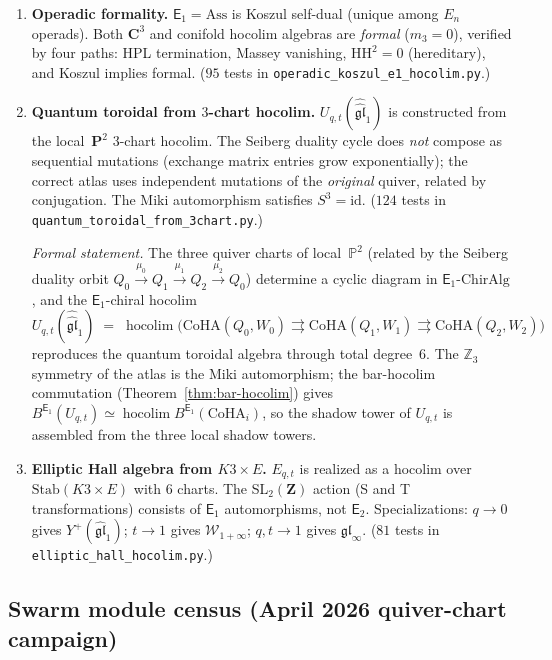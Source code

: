 \documentclass[11pt]{article}
\newcommand{\Z}{\mathbb{Z}}
\newcommand{\bP}{\mathbb{P}}
\newcommand{\Eone}{\mathsf{E}_1}
\newcommand{\Etwo}{\mathsf{E}_2}
\newcommand{\CoHA}{\mathrm{CoHA}}
\begin{document}
\begin{enumerate}
 \item \textbf{Operadic formality.} $\Eone = \mathrm{Ass}$ is Koszul self-dual (unique among $E_n$ operads). Both $\mathbf{C}^3$ and conifold hocolim algebras are \emph{formal} ($m_3 = 0$), verified by four paths: HPL termination, Massey vanishing, $\mathrm{HH}^2 = 0$ (hereditary), and Koszul implies formal. ($95$ tests in \texttt{operadic\_koszul\_e1\_hocolim.py}.)

 \item \textbf{Quantum toroidal from $3$-chart hocolim.} $U_{q,t}(\widehat{\widehat{\mathfrak{gl}}}_1)$ is constructed from the local~$\mathbf{P}^2$ $3$-chart hocolim. The Seiberg duality cycle does \emph{not} compose as sequential mutations (exchange matrix entries grow exponentially); the correct atlas uses independent mutations of the \emph{original} quiver, related by conjugation. The Miki automorphism satisfies $S^3 = \mathrm{id}$. ($124$ tests in \texttt{quantum\_toroidal\_from\_3chart.py}.)

 \emph{Formal statement.} The three quiver charts of local~$\bP^2$ (related by the Seiberg duality orbit $Q_0 \xrightarrow{\mu_0} Q_1 \xrightarrow{\mu_1} Q_2 \xrightarrow{\mu_2} Q_0$) determine a cyclic diagram in $\Eone$-$\mathrm{ChirAlg}$, and the $\Eone$-chiral hocolim
 \[
 U_{q,t}(\widehat{\widehat{\mathfrak{gl}}}_1)
 \;=\;
 \operatorname{hocolim}\bigl(\CoHA(Q_0,W_0)
 \rightrightarrows
 \CoHA(Q_1,W_1)
 \rightrightarrows
 \CoHA(Q_2,W_2)\bigr)
 \]
 reproduces the quantum toroidal algebra through total degree~$6$. The $\Z_3$ symmetry of the atlas is the Miki automorphism; the bar-hocolim commutation (Theorem~\ref{thm:bar-hocolim}) gives $B^{\Eone}(U_{q,t}) \simeq \operatorname{hocolim} B^{\Eone}(\CoHA_i)$, so the shadow tower of $U_{q,t}$ is assembled from the three local shadow towers.

 \item \textbf{Elliptic Hall algebra from $K3 \times E$.} $E_{q,t}$ is realized as a hocolim over $\mathrm{Stab}(K3 \times E)$ with $6$ charts. The SL$_2(\mathbf{Z})$ action (S and T transformations) consists of $\Eone$ automorphisms, not $\Etwo$. Specializations: $q \to 0$ gives $Y^+(\widehat{\mathfrak{gl}}_1)$; $t \to 1$ gives $\mathcal{W}_{1+\infty}$; $q, t \to 1$ gives $\mathfrak{gl}_\infty$. ($81$ tests in \texttt{elliptic\_hall\_hocolim.py}.)
\end{enumerate}

\subsection{Swarm module census (April 2026 quiver-chart campaign)}
\end{document}
